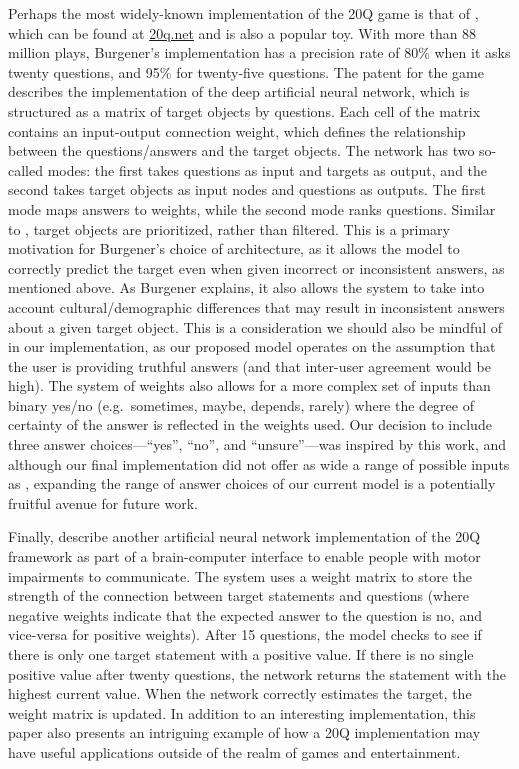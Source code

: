 \documentclass[11pt,a4paper]{article}
\begin{document}
Perhaps the most widely-known implementation of the 20Q game is that of \citet{Burgener2006}, which can be found at \url{20q.net} and is also a popular toy. 
With more than 88 million plays, Burgener's implementation has a precision rate of 80\% when it asks twenty questions, and 95\% for twenty-five questions. 
The patent for the game describes the implementation of the deep artificial neural network, which is structured as a matrix of target objects by questions. 
Each cell of the matrix contains an input-output connection weight, which defines the relationship between the questions/answers and the target objects. 
The network has two so-called modes: the first takes questions as input and targets as output, and the second takes target objects as input nodes and questions as outputs. 
The first mode maps answers to weights, while the second mode ranks questions. 
Similar to \citet{DeyEa2019}, target objects are prioritized, rather than filtered. 
This is a primary motivation for Burgener's choice of architecture, as it allows the model to correctly predict the target even when given incorrect or inconsistent answers, as mentioned above. 
As Burgener explains, it also allows the system to take into account cultural/demographic differences that may result in inconsistent answers about a given target object. 
This is a consideration we should also be mindful of in our implementation, as our proposed model operates on the assumption that the user is providing truthful answers (and that inter-user agreement would be high). 
The system of weights also allows for a more complex set of inputs than binary yes/no (e.g.\ sometimes, maybe, depends, rarely) where the degree of certainty of the answer is reflected in the weights used. 
Our decision to include three answer choices---``yes'', ``no'', and ``unsure''---was inspired by this work, and although our final implementation did not offer as wide a range of possible inputs as \citet{Burgener2006}, expanding the range of answer choices of our current model is a potentially fruitful avenue for future work.

Finally, \citet{ToninEa2018} describe another artificial neural network implementation of the 20Q framework as part of a brain-computer interface to enable people with motor impairments to communicate. 
The system uses a weight matrix to store the strength of the connection between target statements and questions (where negative weights indicate that the expected answer to the question is no, and vice-versa for positive weights). 
After 15 questions, the model checks to see if there is only one target statement with a positive value. 
If there is no single positive value after twenty questions, the network returns the statement with the highest current value. 
When the network correctly estimates the target, the weight matrix is updated. 
In addition to an interesting implementation, this paper also presents an intriguing example of how a 20Q implementation may have useful applications outside of the realm of games and entertainment.
\end{document}
